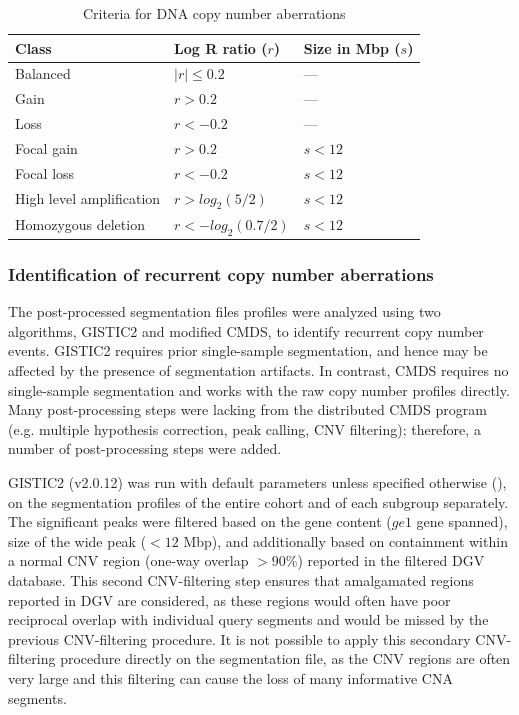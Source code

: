 \begin{table}[H]
	\caption[Criteria for DNA copy number aberrations]
	{
		Criteria for DNA copy number aberrations
	}
	\label{tab:cna-criteria}
	\footnotesize
	\setlength{\extrarowheight}{0.5em}
	\centering
	\begin{tabular}{l | l | l}
		\hline
		\textbf{Class} & \textbf{Log\low{2} R ratio ($r$)} & \textbf{Size in Mbp ($s$)} \\
		\hline
		Balanced & $| r | \le 0.2$ & --- \\
		Gain & $r > 0.2$ & --- \\
		Loss & $r < -0.2$ & --- \\
		Focal gain & $r > 0.2$ & $s < 12$ \\
		Focal loss & $r < -0.2$ & $s < 12$ \\
		High level amplification & $r > log_2(5/2)$ & $s < 12$ \\
		Homozygous deletion & $r < -log_2(0.7/2)$ & $s < 12$ \\
		\hline
	\end{tabular}
\end{table}

\subsubsection{Identification of recurrent copy number aberrations}

The post-processed segmentation files profiles were analyzed using two algorithms, GISTIC2 and modified CMDS, to identify recurrent copy number events. GISTIC2 requires prior single-sample segmentation, and hence may be affected by the presence of segmentation artifacts. In contrast, CMDS requires no single-sample segmentation and works with the raw copy number profiles directly. Many post-processing steps were lacking from the distributed CMDS program (e.g. multiple hypothesis correction, peak calling, CNV filtering); therefore, a number of post-processing steps were added.

GISTIC2 (v2.0.12)  was run with default parameters unless specified otherwise (), on the segmentation profiles of the entire cohort and of each subgroup separately. The significant peaks were filtered based on the gene content ($ge 1$ gene spanned), size of the wide peak ($< 12$ Mbp), and additionally based on containment within a normal CNV region (one-way overlap $> 90$\%) reported in the filtered DGV database. This second CNV-filtering step ensures that amalgamated regions reported in DGV are considered, as these regions would often have poor reciprocal overlap with individual query segments and would be missed by the previous CNV-filtering procedure. It is not possible to apply this secondary CNV-filtering procedure directly on the segmentation file, as the CNV regions are often very large and this filtering can cause the loss of many informative CNA segments.

